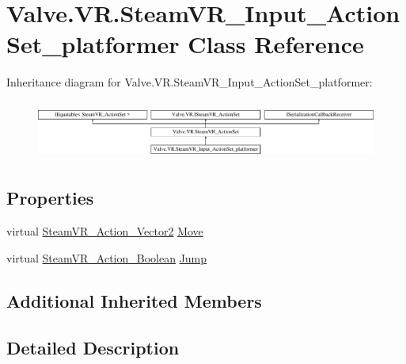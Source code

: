 \hypertarget{class_valve_1_1_v_r_1_1_steam_v_r___input___action_set__platformer}{}\section{Valve.\+V\+R.\+Steam\+V\+R\+\_\+\+Input\+\_\+\+Action\+Set\+\_\+platformer Class Reference}
\label{class_valve_1_1_v_r_1_1_steam_v_r___input___action_set__platformer}
Inheritance diagram for Valve.\+V\+R.\+Steam\+V\+R\+\_\+\+Input\+\_\+\+Action\+Set\+\_\+platformer\+:\begin{figure}[H]
\begin{center}
\leavevmode
\includegraphics[height=1.944444cm]{class_valve_1_1_v_r_1_1_steam_v_r___input___action_set__platformer}
\end{center}
\end{figure}
\subsection*{Properties}
\begin{DoxyCompactItemize}
\item 
virtual \mbox{\hyperlink{class_valve_1_1_v_r_1_1_steam_v_r___action___vector2}{Steam\+V\+R\+\_\+\+Action\+\_\+\+Vector2}} \mbox{\hyperlink{class_valve_1_1_v_r_1_1_steam_v_r___input___action_set__platformer_a03c04772957310b9269d40b9f30defc3}{Move}}
\item 
virtual \mbox{\hyperlink{class_valve_1_1_v_r_1_1_steam_v_r___action___boolean}{Steam\+V\+R\+\_\+\+Action\+\_\+\+Boolean}} \mbox{\hyperlink{class_valve_1_1_v_r_1_1_steam_v_r___input___action_set__platformer_a2abd6fbf45f724e0c2cdf0851ac43702}{Jump}}
\end{DoxyCompactItemize}
\subsection*{Additional Inherited Members}


\subsection{Detailed Description}


